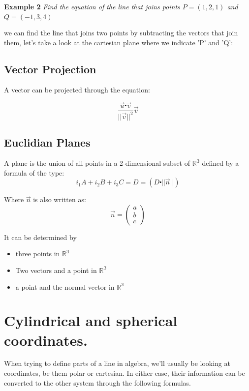 \documentclass[11pt,fleqn]{book} %
\begin{document}
\textbf{Example 2}
\textit{Find the equation of the line that joins points $P=(1,2,1)$ and
$ Q=(-1,3,4) $}

we can find the line that joins two points by subtracting the vectors that join them, let's take a look at the 
cartesian plane where we indicate 'P' and 'Q':

\subsection{Vector Projection}

A vector can be projected through the equation:

\begin{equation}
    \frac{\vec{u} \centerdot \vec{v}}{||\vec{v}||^2} \vec{v}
\end{equation}

\subsection{Euclidian Planes}

A plane is the union of all points in a 2-dimensional subset of $ \mathbb{R^3} $ defined by a formula of the type:
\begin{equation}
    i_1 A + i_2 B + i_3 C = D = (D \centerdot || \vec{n} ||)
\end{equation}

Where $ \vec{n} $ is also written as:
\begin{equation}
    \vec{n} = \begin{pmatrix}
        a \\
        b \\
        c
    \end{pmatrix}
\end{equation}

It can be determined by 
\begin{itemize}
    \item three points in $ \mathbb{R^3} $
    \item Two vectors and a point in $ \mathbb{R^3} $
    \item a point and the normal vector in $ \mathbb{R^3} $
\end{itemize}

\section{Cylindrical and spherical coordinates.}

When trying to define parts of a line in algebra, we'll usually be looking at
coordinates, be them polar or cartesian. In either case, their information can be 
converted to the other system through the following formulas.
\end{document}
